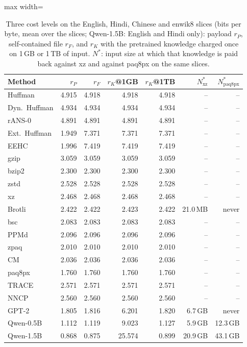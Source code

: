 \begin{table}[t]\centering\caption{Three cost levels on the English, Hindi, Chinese and enwik8 slices (bits per byte, mean over the slices; Qwen-1.5B: English and Hindi only): payload $r_P$, self-contained file $r_F$, and $r_K$ with the pretrained knowledge charged once on 1\,GB or 1\,TB of input. $N^\ast$: input size at which that knowledge is paid back against xz and against paq8px on the same slices.}\label{tab:cost}\footnotesize\setlength{\tabcolsep}{3.5pt}
\begin{adjustbox}{max width=\columnwidth}\begin{tabular}{@{}lrrrrrr@{}}\toprule
Method & $r_P$ & $r_F$ & $r_K$@1GB & $r_K$@1TB & $N^\ast_{\mathrm{xz}}$ & $N^\ast_{\mathrm{paq8px}}$\\\midrule
Huffman & 4.915 & 4.918 & 4.918 & 4.918 & -- & --\\
Dyn.\ Huffman & 4.934 & 4.934 & 4.934 & 4.934 & -- & --\\
rANS-0 & 4.891 & 4.891 & 4.891 & 4.891 & -- & --\\
Ext.\ Huffman & 1.949 & 7.371 & 7.371 & 7.371 & -- & --\\
EEHC & 1.996 & 7.419 & 7.419 & 7.419 & -- & --\\
gzip & 3.059 & 3.059 & 3.059 & 3.059 & -- & --\\
bzip2 & 2.300 & 2.300 & 2.300 & 2.300 & -- & --\\
zstd & 2.528 & 2.528 & 2.528 & 2.528 & -- & --\\
xz & 2.468 & 2.468 & 2.468 & 2.468 & -- & --\\
Brotli & 2.422 & 2.422 & 2.423 & 2.422 & 21.0\,MB & never\\
bsc & 2.083 & 2.083 & 2.083 & 2.083 & -- & --\\
PPMd & 2.096 & 2.096 & 2.096 & 2.096 & -- & --\\
zpaq & 2.010 & 2.010 & 2.010 & 2.010 & -- & --\\
CM & 2.036 & 2.036 & 2.036 & 2.036 & -- & --\\
paq8px & 1.760 & 1.760 & 1.760 & 1.760 & -- & --\\
TRACE & 2.571 & 2.571 & 2.571 & 2.571 & -- & --\\
NNCP & 2.560 & 2.560 & 2.560 & 2.560 & -- & --\\
GPT-2 & 1.805 & 1.816 & 6.201 & 1.820 & 6.7\,GB & never\\
Qwen-0.5B & 1.112 & 1.119 & 9.023 & 1.127 & 5.9\,GB & 12.3\,GB\\
Qwen-1.5B & 0.868 & 0.875 & 25.574 & 0.899 & 20.9\,GB & 43.1\,GB\\
\bottomrule\end{tabular}\end{adjustbox}\end{table}